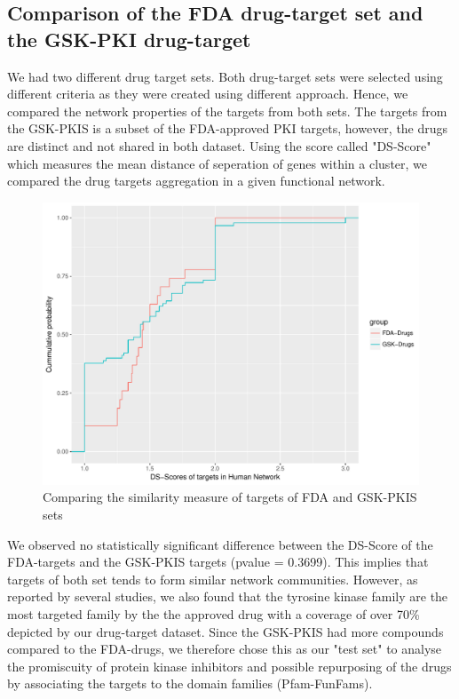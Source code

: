 \documentclass[a4paper, 11pt]{article}
\begin{document}
\subsection*{Comparison of the FDA drug-target set and the GSK-PKI drug-target}
We had two different drug target sets. Both drug-target sets were selected using different criteria as they were created using different approach. Hence, we compared the network properties of the targets from both sets. The targets from the GSK-PKIS is a subset of the FDA-approved PKI targets, however, the drugs are distinct and not shared in both dataset. 
Using the \cite{menche2015uncovering} score called "DS-Score" which measures the mean distance of seperation of genes within a cluster, we compared the drug targets aggregation in a given functional network.
\begin{figure}[H]
	\includegraphics[width=.9\linewidth]{figures/dsfdagsk.pdf}
	\centering
	\caption{Comparing the similarity measure of targets of FDA and GSK-PKIS sets}
	\label{dsgsk}
\end{figure}

We observed no statistically significant difference between the DS-Score of the FDA-targets and the GSK-PKIS targets (pvalue = 0.3699). This implies that targets of both set tends to form similar network communities. However, as reported by several studies, we also found that the tyrosine kinase family are the most targeted family by the the approved drug with a coverage of over 70\% depicted by our drug-target dataset. Since the GSK-PKIS had more compounds compared to the FDA-drugs, we therefore chose this as our "test set" to analyse the promiscuity of protein kinase inhibitors and possible repurposing of the drugs by associating the targets to the domain families (Pfam-FunFams).
\end{document}
